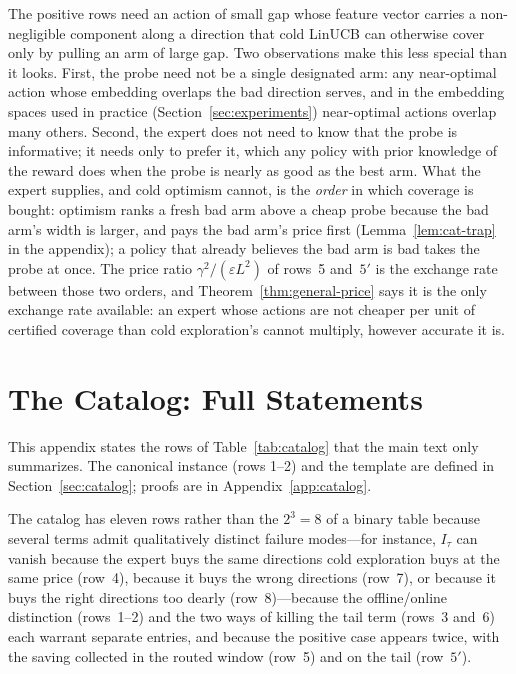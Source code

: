 \documentclass{article}
\theoremstyle{definition}
\theoremstyle{remark}
\newcommand{\eps}{\varepsilon}
\theoremstyle{remark}
\begin{document}
The positive rows need an action of small gap whose feature vector carries a
non-negligible component along a direction that cold LinUCB can otherwise
cover only by pulling an arm of large gap. Two observations make this less
special than it looks. First, the probe need not be a single designated arm:
any near-optimal action whose embedding overlaps the bad direction serves,
and in the embedding spaces used in practice (Section~\ref{sec:experiments})
near-optimal actions overlap many others. Second, the expert does not need to
know that the probe is informative; it needs only to prefer it, which any
policy with prior knowledge of the reward does when the probe is nearly as
good as the best arm. What the expert supplies, and cold optimism cannot, is
the \emph{order} in which coverage is bought: optimism ranks a fresh bad arm
above a cheap probe because the bad arm's width is larger, and pays the bad
arm's price first (Lemma~\ref{lem:cat-trap} in the appendix); a policy that
already believes the bad arm is bad takes the probe at once. The price ratio
$\gamma^2/(\eps L^2)$ of rows~5 and~$5'$ is the exchange rate between those two
orders, and Theorem~\ref{thm:general-price} says it is the only exchange rate
available: an expert whose actions are not cheaper per unit of certified
coverage than cold exploration's cannot multiply, however accurate it is.

\section{The Catalog: Full Statements}
\label{app:catalog-statements}

This appendix states the rows of Table~\ref{tab:catalog} that the main text
only summarizes. The canonical instance (rows 1--2) and the template are
defined in Section~\ref{sec:catalog}; proofs are in Appendix~\ref{app:catalog}.

The catalog has eleven rows rather than the $2^3=8$ of a binary table
because several terms admit qualitatively distinct failure modes---for
instance, $I_\tau$ can vanish because the expert buys the same directions cold
exploration buys at the same price (row~4), because it buys the wrong
directions (row~7), or because it buys the right directions too dearly
(row~8)---because the offline/online distinction (rows~1--2) and the two
ways of killing the tail term (rows~3 and~6) each warrant separate entries,
and because the positive case appears twice, with the saving collected in
the routed window (row~5) and on the tail (row~$5'$).
\end{document}
